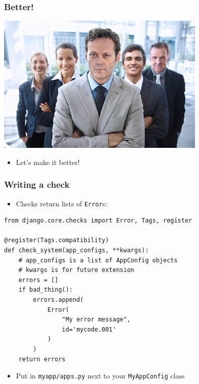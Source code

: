 \documentclass{beamer}
\begin{document}
\begin{frame}[fragile]\frametitle{Better!}

    \begin{center}
        \includegraphics[width=10cm]{better}
    \end{center}

    \begin{itemize}
        \item Let's make it better!
    \end{itemize}

\end{frame}


\begin{frame}[fragile]\frametitle{Writing a check}

    \begin{itemize}
        \item Checks return lists of \texttt{Error}s:
    \end{itemize}

    \begin{lstlisting}
from django.core.checks import Error, Tags, register

@register(Tags.compatibility)
def check_system(app_configs, **kwargs):
    # app_configs is a list of AppConfig objects
    # kwargs is for future extension
    errors = []
    if bad_thing():
        errors.append(
            Error(
                "My error message",
                id='mycode.001'
            )
        )
    return errors
    \end{lstlisting}

    \begin{itemize}
        \item Put in \texttt{myapp/apps.py} next to your \texttt{MyAppConfig} class
    \end{itemize}

\end{frame}
\end{document}

